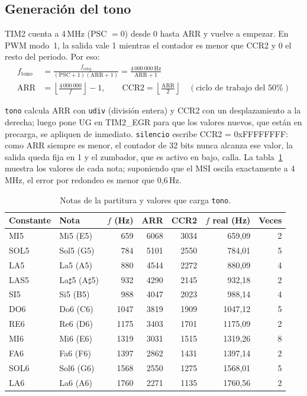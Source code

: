 \documentclass[11pt,letterpaper]{article}
\begin{document}
\subsection{Generación del tono}

TIM2 cuenta a 4\,MHz (PSC $=0$) desde 0 hasta ARR y vuelve a empezar. En PWM modo~1, la salida vale 1
mientras el contador es menor que CCR2 y 0 el resto del periodo. Por eso:
\begin{align}
  f_{\text{tono}} &= \frac{f_{\text{reloj}}}{(\mathrm{PSC}+1)(\mathrm{ARR}+1)} = \frac{4\,000\,000~\text{Hz}}{\mathrm{ARR}+1}
  \label{eq:ftono}\\[4pt]
  \mathrm{ARR} &= \left\lfloor \frac{4\,000\,000}{f} \right\rfloor - 1,
  \qquad
  \mathrm{CCR2} = \left\lfloor \frac{\mathrm{ARR}}{2} \right\rfloor
  \quad (\text{ciclo de trabajo del 50\%})
  \label{eq:arr}
\end{align}

\texttt{tono} calcula ARR con \texttt{udiv} (división entera) y CCR2 con un desplazamiento a la derecha;
luego pone UG en TIM2\_EGR para que los valores nuevos, que están en precarga, se apliquen de inmediato.
\texttt{silencio} escribe CCR2 = 0xFFFFFFFF: como ARR siempre es menor, el contador de 32 bits nunca
alcanza ese valor, la salida queda fija en 1 y el zumbador, que es activo en bajo, calla. La tabla~\ref{tab:notas} muestra los valores
de cada nota; suponiendo que el MSI oscila exactamente a 4\,MHz, el error por redondeo es menor que 0,6\,Hz.

\begin{table}[tbp]
  \centering\small
  \caption{Notas de la partitura y valores que carga \texttt{tono}.}
  \label{tab:notas}
  \begin{tabular}{@{}>{\ttfamily}l l r r r r r@{}}
    \toprule
    \normalfont Constante & Nota & $f$ (Hz) & ARR & CCR2 & $f$ real (Hz) & Veces \\
    \midrule
    MI5  & Mi5 (E5)            &  659 & 6068 & 3034 &  659,09 & 2 \\
    SOL5 & Sol5 (G5)           &  784 & 5101 & 2550 &  784,01 & 5 \\
    LA5  & La5 (A5)            &  880 & 4544 & 2272 &  880,09 & 4 \\
    LAS5 & La$\sharp$5 (A$\sharp$5) & 932 & 4290 & 2145 & 932,18 & 2 \\
    SI5  & Si5 (B5)            &  988 & 4047 & 2023 &  988,14 & 4 \\
    DO6  & Do6 (C6)            & 1047 & 3819 & 1909 & 1047,12 & 5 \\
    RE6  & Re6 (D6)            & 1175 & 3403 & 1701 & 1175,09 & 2 \\
    MI6  & Mi6 (E6)            & 1319 & 3031 & 1515 & 1319,26 & 8 \\
    FA6  & Fa6 (F6)            & 1397 & 2862 & 1431 & 1397,14 & 2 \\
    SOL6 & Sol6 (G6)           & 1568 & 2550 & 1275 & 1568,01 & 5 \\
    LA6  & La6 (A6)            & 1760 & 2271 & 1135 & 1760,56 & 2 \\
    \bottomrule
  \end{tabular}
\end{table}
\end{document}
